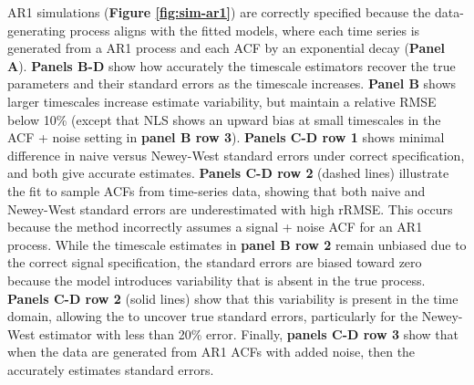 \documentclass[latex/main.tex]{subfiles}
\begin{document}
AR1 simulations (\textbf{Figure \ref{fig:sim-ar1}}) are correctly specified because the data-generating process aligns with the fitted models, where each time series is generated from a AR1 process and each ACF by an exponential decay (\textbf{Panel A}). \textbf{Panels B-D} show how accurately the timescale estimators recover the true parameters and their standard errors as the timescale increases. \textbf{Panel B} shows larger timescales increase estimate variability, but maintain a relative RMSE below 10\% (except that NLS shows an upward bias at small timescales in the ACF + noise setting in \textbf{panel B row 3}). \textbf{Panels C-D row 1} shows minimal difference in naive versus Newey-West standard errors under correct specification, and both give accurate estimates. \textbf{Panels C-D row 2} (dashed lines) illustrate the  fit to sample ACFs from time-series data, showing that both naive and Newey-West standard errors are underestimated with high rRMSE. This occurs because the method incorrectly assumes a signal + noise ACF for an AR1 process. While the timescale estimates in \textbf{panel B row 2} remain unbiased due to the correct signal specification, the standard errors are biased toward zero because the model introduces variability that is absent in the true process. \textbf{Panels C-D row 2} (solid lines) show that this variability is present in the time domain, allowing the  to uncover true standard errors, particularly for the Newey-West estimator with less than 20\% error. Finally, \textbf{panels C-D row 3} show that when the data are generated from AR1 ACFs with added noise, then the  accurately estimates standard errors.\\
\end{document}
